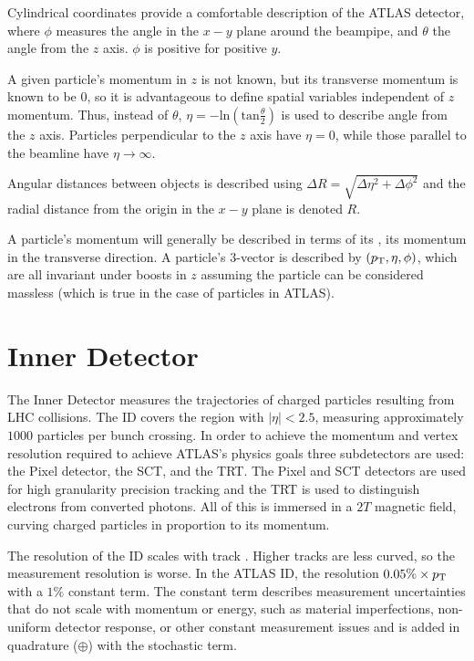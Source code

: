 Cylindrical coordinates provide a comfortable description of the \ac{ATLAS} detector, where $\phi$ measures the angle in the $x-y$ plane around the beampipe, and $\theta$ the angle from the $z$ axis. $\phi$ is positive for positive $y$. 

A given particle's momentum in $z$ is not known, but its transverse momentum is known to be $0$, so it is advantageous to define spatial variables independent of $z$ momentum. Thus, instead of $\theta$, $\eta = - \textrm{ln}(\textrm{tan}\frac{\theta}{2})$ is used to describe angle from the $z$ axis. Particles perpendicular to the $z$ axis have $\eta = 0$, while those parallel to the beamline have $\eta \rightarrow \infty$. 

Angular distances between objects is described using $\Delta R = \sqrt{\Delta \eta ^2 + \Delta \phi ^2}$ and the radial distance from the origin in the $x-y$ plane is denoted $R$. 

A particle's momentum will generally be described in terms of its \pT, its momentum in the transverse direction. A particle's $3$-vector is described by $(p_{\text{T}}, \eta, \phi)$, which are all invariant under boosts in $z$ assuming the particle can be considered massless (which is true in the case of particles in \ac{ATLAS}).






\section{Inner Detector}
The Inner Detector measures the trajectories of charged particles resulting from \ac{LHC} collisions. The \ac{ID} covers the region with $|\eta| < 2.5$, measuring approximately $1000$ particles per bunch crossing. In order to achieve the momentum and vertex resolution required to achieve \ac{ATLAS}'s physics goals three subdetectors are used: the Pixel detector, the \ac{SCT}, and the \ac{TRT}. The Pixel and \ac{SCT} detectors are used for high granularity precision tracking and the \ac{TRT} is used to distinguish electrons from converted photons. All of this is immersed in a $2T$ magnetic field, curving charged particles in proportion to its momentum.



The \pt resolution of the \ac{ID} scales with track \pt. Higher \pt tracks are less curved, so the measurement resolution is worse. In the \ac{ATLAS} \ac{ID}, the \pt resolution  $0.05\% \times p_{\text{T}}$ with a $1\%$ constant term. The constant term describes measurement uncertainties that do not scale with momentum or energy, such as material imperfections, non-uniform detector response, or other constant measurement issues and is added in quadrature ($\oplus$) with the stochastic term.



